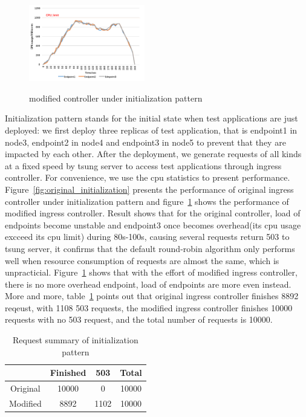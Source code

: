 \begin{figure}[!htb]
  \centering
  \includegraphics[width=0.45\textwidth]{images/data2.png}\\
  \caption{modified controller under initialization pattern}
  \label{fig:modified_initialization}
\end{figure}

Initialization pattern stands for the initial state when test applications are just deployed: we first deploy three replicas of test application, that is endpoint1 in node3, endpoint2 in node4 and endpoint3 in node5
to prevent that they are impacted by each other. After the deployment, we generate requests of all kinds at a fixed speed by tsung server to access test applications through ingress controller.
For convenience, we use the cpu statistics to present performance. Figure~\ref{fig:original_initialization} presents the performance of original ingress controller under initialization pattern and
figure~{\ref{fig:modified_initialization}} shows the performance of modified ingress controller. Result shows that for the original controller, load of endpoints become unstable and endpoint3 once becomes overhead(its cpu usage excceed its cpu limit) during 80s-100s, causing several
requests return 503 to tsung server, it confirms that the default round-robin algorithm only performs well when resource consumption of requests are almost the same, which is unpracticial. Figure~{\ref{fig:modified_initialization}} shows that
with the effort of modified ingress controller, there is no more overhead endpoint, load of endpoints are more even instead. More and more, table~{\ref{table:request_summary1}} points out that original ingress controller finishes 8892 reqeust, with 1108 503 requests, the
modified ingress controller finishes 10000 requests with no 503 request, and the total number of requests is 10000.
\hspace{0pt}
\begin{table}[htbp]
 \begin{center}
  \begin{tabular}{c|c|c|c}
   \hline
              & Finished    & 503   & Total  \\  \hline
   Original           & 10000   & 0   & 10000 \\ \hline
   Modified      & 8892     & 1102    & 10000    \\ \hline
  \end{tabular}
 \end{center}
 \caption{Request summary of initialization pattern}
 \label{table:request_summary1}
\end{table}
